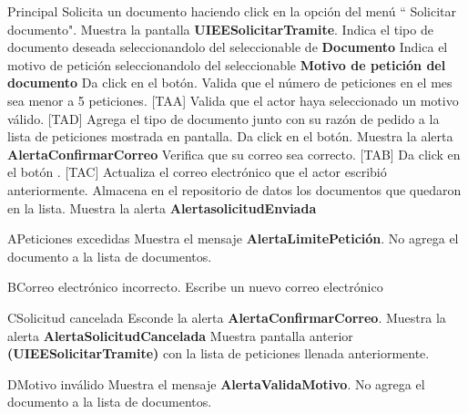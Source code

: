 \begin{UCtrayectoria}{Principal}
  \UCpaso[\UCactor] Solicita un documento haciendo click en la opción del menú `` Solicitar documento".
  \UCpaso Muestra la pantalla  {\bf UIEESolicitarTramite}.
  \UCpaso[\UCactor] Indica el tipo de documento deseada seleccionandolo del seleccionable de {\bf Documento } 
  \UCpaso[\UCactor] Indica el motivo de petición seleccionandolo del seleccionable {\bf Motivo de petición del documento}
  \UCpaso[\UCactor] Da click en el botón. 
  \UCpaso  Valida que el número de peticiones en el mes sea menor a 5 peticiones. [TAA] 
  \UCpaso Valida que el actor haya seleccionado un motivo válido. [TAD]
  \UCpaso Agrega el tipo de documento junto con su razón de pedido a la lista de peticiones mostrada en pantalla.
  \UCpaso[\UCactor]  Da click en el botón.
  \UCpaso Muestra la alerta {\bf AlertaConfirmarCorreo} 
  \UCpaso[\UCactor] Verifica que su correo sea correcto. [TAB]
  \UCpaso[\UCactor] Da click en el botón . [TAC]
  \UCpaso Actualiza el correo electrónico que el actor escribió anteriormente.
  \UCpaso Almacena en el repositorio de datos los documentos que quedaron en la lista.
  \UCpaso Muestra la alerta  {\bf AlertasolicitudEnviada}
\end{UCtrayectoria}

\begin{UCtrayectoriaA}{A}{Peticiones excedidas} 
\UCpaso Muestra el mensaje {\bf AlertaLimitePetición}.
  \UCpaso No agrega el documento a la lista de documentos.
\end{UCtrayectoriaA}

\begin{UCtrayectoriaA}{B}{Correo electrónico incorrecto.} 
  \UCpaso[\UCactor] Escribe un nuevo correo electrónico 
\end{UCtrayectoriaA}

\begin{UCtrayectoriaA}{C}{Solicitud cancelada} 
 \UCpaso Esconde la alerta  {\bf AlertaConfirmarCorreo}.
 \UCpaso Muestra la alerta {\bf AlertaSolicitudCancelada }
 \UCpaso Muestra pantalla anterior {\bf (UIEESolicitarTramite)} con la lista de peticiones llenada anteriormente.
\end{UCtrayectoriaA}

\begin{UCtrayectoriaA}{D}{Motivo inválido} 
\UCpaso Muestra el mensaje {\bf AlertaValidaMotivo}.
  \UCpaso No agrega el documento a la lista de documentos.
\end{UCtrayectoriaA}


